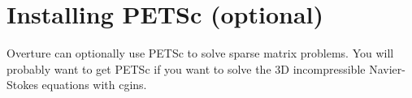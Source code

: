 \documentclass{article}
\newcommand{\software}{../software}
\begin{document}
% 
% 

\clearpage
\section{Installing PETSc (optional)}

Overture can optionally use PETSc to solve sparse matrix problems. You will probably want 
to get PETSc if you want to solve the 3D incompressible Navier-Stokes equations with cgins.
\end{document}

